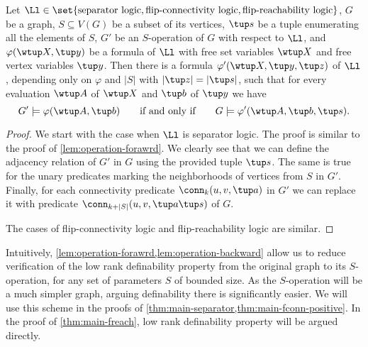 \begin{lemma}
    \label{lem:operation-backward}
    Let $\Ll \in \set{\text{separator logic}, \text{flip-connectivity logic}, \text{flip-reachability logic}}$, $G$ be a graph, $S \subseteq V(G)$ be a subset of its vertices, $\tup s$ be a tuple enumerating all the elements of $S$, $G'$ be an $S$-operation of $G$ with respect to $\Ll$, and $\varphi(\wtup X, \tup y)$ be a formula of $\Ll$ with free set variables $\wtup X$ and free vertex variables $\tup y$.
    Then there is a formula $\varphi'(\wtup X, \tup y, \tup z)$ of $\Ll$, depending only on $\varphi$ and $|S|$ with $|\tup z| = |\tup s|$, such that for every evaluation $\wtup A$ of $\wtup X$ and $\tup b$ of $\tup y$ we have
    \[
        G' \models \varphi(\wtup A, \tup b) \qquad\textrm{if and only if}\qquad G \models \varphi'(\wtup A, \tup b, \tup s).
    \]
\end{lemma}
\begin{proof}
    We start with the case when $\Ll$ is separator logic.
    The proof is similar to the proof of \cref{lem:operation-forawrd}.
    We clearly see that we can define the adjacency relation of $G'$ in $G$ using the provided tuple $\tup s$.
    The same is true for the unary predicates marking the neighborhoods of vertices from $S$ in $G'$.
    Finally, for each connectivity predicate $\conn_k(u, v, \tup a)$ in $G'$ we can replace it with predicate $\conn_{k+|S|}(u, v, \tup a\tup s)$ of $G$.

    The cases of flip-connectivity logic and flip-reachability logic are similar.
\end{proof}

Intuitively,
\cref{lem:operation-forawrd,lem:operation-backward} allow us to reduce verification of the low rank definability property from the original graph to its $S$-operation, for any set of parameters $S$ of bounded size. As the $S$-operation will be a much simpler graph, arguing definability there is significantly easier. We will use this scheme in the proofs of \cref{thm:main-separator,thm:main-fconn-positive}. In the proof of \cref{thm:main-freach}, low rank definability property will be argued directly.